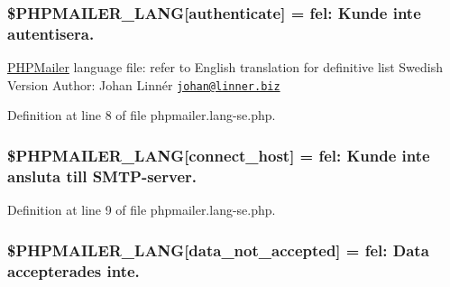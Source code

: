 \subsubsection[{\texorpdfstring{\$\+P\+H\+P\+M\+A\+I\+L\+E\+R\+\_\+\+L\+A\+NG}{$PHPMAILER_LANG}}]{\setlength{\rightskip}{0pt plus 5cm}\$P\+H\+P\+M\+A\+I\+L\+E\+R\+\_\+\+L\+A\+NG\mbox{[}\textquotesingle{}authenticate\textquotesingle{}\mbox{]} =  fel\+: Kunde inte autentisera.\textquotesingle{}}\hypertarget{phpmailer_8lang-se_8php_a2cb33073c989b85580748e331ed8b4aa}{}\label{phpmailer_8lang-se_8php_a2cb33073c989b85580748e331ed8b4aa}
\hyperlink{class_p_h_p_mailer}{P\+H\+P\+Mailer} language file\+: refer to English translation for definitive list Swedish Version Author\+: Johan Linnér \href{mailto:johan@linner.biz}{\tt johan@linner.\+biz} 

Definition at line 8 of file phpmailer.\+lang-\/se.\+php.

\subsubsection[{\texorpdfstring{\$\+P\+H\+P\+M\+A\+I\+L\+E\+R\+\_\+\+L\+A\+NG}{$PHPMAILER_LANG}}]{\setlength{\rightskip}{0pt plus 5cm}\$P\+H\+P\+M\+A\+I\+L\+E\+R\+\_\+\+L\+A\+NG\mbox{[}\textquotesingle{}connect\+\_\+host\textquotesingle{}\mbox{]} =  fel\+: Kunde inte ansluta till {\bf S\+M\+TP}-\/server.\textquotesingle{}}\hypertarget{phpmailer_8lang-se_8php_a2ee0cc637a06b96e45600db31c6799ee}{}\label{phpmailer_8lang-se_8php_a2ee0cc637a06b96e45600db31c6799ee}


Definition at line 9 of file phpmailer.\+lang-\/se.\+php.

\subsubsection[{\texorpdfstring{\$\+P\+H\+P\+M\+A\+I\+L\+E\+R\+\_\+\+L\+A\+NG}{$PHPMAILER_LANG}}]{\setlength{\rightskip}{0pt plus 5cm}\$P\+H\+P\+M\+A\+I\+L\+E\+R\+\_\+\+L\+A\+NG\mbox{[}\textquotesingle{}data\+\_\+not\+\_\+accepted\textquotesingle{}\mbox{]} =  fel\+: Data accepterades inte.\textquotesingle{}}\hypertarget{phpmailer_8lang-se_8php_a814c6b191205d2361b3233e9c9d6fda5}{}\label{phpmailer_8lang-se_8php_a814c6b191205d2361b3233e9c9d6fda5}


